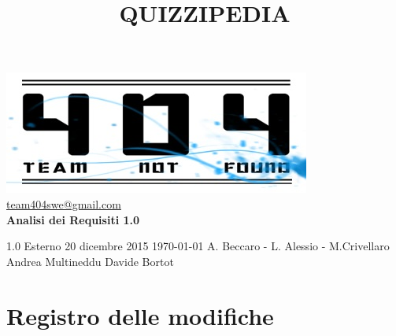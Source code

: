 \documentclass[a4paper,11pt]{article}
\title{\textbf{{\fontsize{8mm}{5mm}\selectfont QUIZZIPEDIA}}}
\date{}
\author{}
\begin{document}
	\maketitle
	\thispagestyle{empty}
	\begin{center}
	\includegraphics{team_not_found.jpg}\\
	\fontsize{5mm}{3mm}\url{team404swe@gmail.com}\\
	
	\vspace{50mm}
	\textbf{Analisi dei Requisiti 1.0}
	\end{center}
	
			{1.0} 							%
			{Esterno} 						%
			{20 dicembre 2015} 				%
			{\today} 						%
			{A. Beccaro - L. Alessio - M.Crivellaro}	%
			{Andrea Multineddu} 				%
			{Davide Bortot} 		%
	\newpage
	\thispagestyle{empty}
	\null
	\newpage
		
	\hspace{30 mm}
	\fancyfoot[R]{\thepage}
	\section*{Registro delle modifiche}
	
\end{document}
